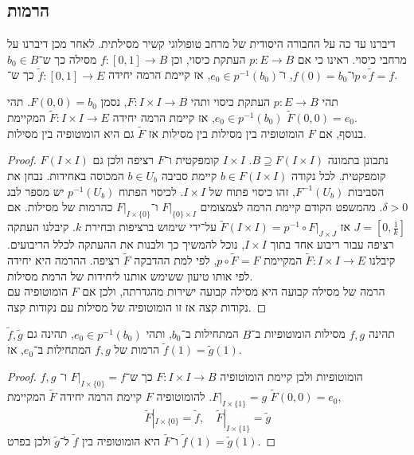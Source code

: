 \subsection{הרמות}
דיברנו עד כה על החבורה היסודית של מרחב טופולוגי קשיר מסילתית.
לאחר מכן דיברנו על מרחבי כיסוי.
ראינו כי אם $p : E \to B$ העתקת כיסוי, וכן $f : [0, 1] \to B$ מסילה כך ש־$b_0 \in B$ ו־$f(0) = b_0$, ו־$e_0 \in p^{-1}(b_0)$,
אז קיימת הרמה יחידה $\tilde{f} : [0, 1] \to E$ כך ש־$p \circ \tilde{f} = f$.
\begin{theorem}
	תהי $p : E \to B$ העתקת כיסוי ותהי $F : I \times I \to B$, נסמן $F(0, 0) = b_0$.
	תהי $e_0 \in p^{-1}(b_0)$, אז קיימת הרמה יחידה $\tilde{F} : I \times I \to E$ המקיימת $\tilde{F}(0, 0) = e_0$. \\
	בנוסף, אם $F$ הומוטופיה בין מסילות בין מסילות אז $\tilde{F}$ גם היא הומוטופיה בין מסילות.
\end{theorem}
\begin{proof}
	נתבונן בתמונה $B \supseteq F(I \times I)$. $I \times I$ קומפקטית ו־$F$ רציפה ולכן גם $F(I \times I)$ קומפקטית.
	לכל נקודה $b \in F(I \times I)$ קיימת סביבה $b \in U_b$ המכוסה באחידות.
	נבחן את הסביבות $F^{-1}(U_b)$, זהו כיסוי פתוח של $I \times I$.
	לכיסוי הפתוח $p^{-1}(U_b)$ יש מספר לבג $\delta > 0$.
	מהמשפט הקודם קיימת הרמה לצמצומים $F |_{\{ 0 \} \times I}$ ו־$F |_{I \times \{ 0 \}}$ כהרמות של מסילות.
	אם $J = [0, \frac{1}{k}]$ אז $\tilde{F}(I \times I) = p^{-1} \circ F |_{J \times J}$ על־ידי שימוש ברציפות ובחירת $k$.
	קיבלנו העתקה רציפה עבור ריבוע אחד בתוך $I \times I$, נוכל להמשיך כך ולבנות את ההעתקה לכלל הריבועים.
	קיבלנו $\tilde{F} : I \times I \to E$ המקיימת $p \circ \tilde{F} = F$, לפי למת ההדבקה $\tilde{F}$ רציפה.
	ההרמה היא יחידה לפי אותו טיעון ששימש אותנו ליחידות של הרמת מסילות. \\
	הרמה של מסילה קבועה היא מסילה קבועה ישירות מהגדרתה, ולכן אם $F$ הומוטופיה עם נקודות קצה אז זו הומוטופיה של מסילות עם נקודות קצה.
\end{proof}
\begin{conclusion}
	תהינה $f, g$ מסילות הומוטופיות ב־$B$ המתחילות ב־$b_0$, ותהי $e_0 \in p^{-1}(b_0)$, תהינה גם $\tilde{f}, \tilde{g}$ הרמות של $f, g$ המתחילות ב־$e_0$, אז $\tilde{f}(1) = \tilde{g}(1)$.
\end{conclusion}
\begin{proof}
	$f, g$ הומוטופיות ולכן קיימת הומוטופיה $F : I \times I \to B$ כך ש־$F |_{I \times \{ 0 \}} = f$ ו־$F |_{I \times \{ 1 \}} = g$.
	להומוטופיה $F$ קיימת הרמה יחידה $\tilde{F}$ המקיימת $\tilde{F}(0, 0) = e_0$,
	\[
		\tilde{F} |_{I \times \{ 0 \}} = \tilde{f},
		\quad
		\tilde{F} |_{I \times \{ 1 \}} = \tilde{g}
	\]
	ו־$\tilde{F}$ היא הומוטופיה בין $\tilde{f}$ ל־$\tilde{g}$ ולכן בפרט $\tilde{f}(1) = \tilde{g}(1)$.
\end{proof}

